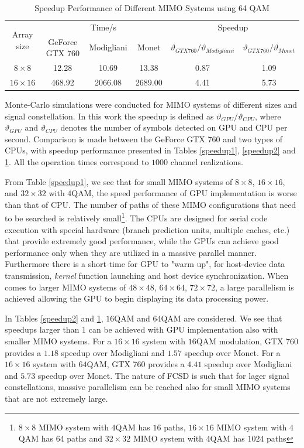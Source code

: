 \documentclass[letterpaper, 10pt, conference,twoside]{ieeeconf}
\begin{document}
\begin{table}[htb]
\centering
\caption{Speedup Performance of Different MIMO Systems using 64 QAM}
\begin{tabular}{|c|c|c|c|c|c|}
\hline
\multirow{2}{*}{ Array size} & \multicolumn{3}{|c|}{Time/s} & \multicolumn{2}{|c|}{Speedup}\\
\cline{2-6}
&GeForce GTX 760 & Modigliani & Monet &  $\vartheta_{GTX 760}/\vartheta_{Modigliani}$  &  $\vartheta_{GTX 760}/\vartheta_{Monet}$ \\
\hline
$8\times 8$&12.28& 10.69&13.38 & 0.87&1.09 \\
\hline
$16\times 16$&468.92 & 2066.08&2689.00& 4.41& 5.73\\
\hline
\end{tabular}
\label{speedup3}
\end{table}
Monte-Carlo simulations were conducted for MIMO systems of different sizes and signal constellation. In this work the speedup is defined as $\vartheta_{GPU}/\vartheta_{CPU}$, where $\vartheta_{GPU}$ and $\vartheta_{CPU}$ denotes the number of symbols detected on GPU and CPU per second. Comparison is made between the GeForce GTX 760 and two types of CPUs, with speedup performance presented in Tables \ref{speedup1}, \ref{speedup2} and \ref{speedup3}. All the operation times correspond to $1000$ channel realizations.

From Table \ref{speedup1}, we see that for small MIMO systems of $8\times 8$, $16\times 16$, and $32\times 32$ with $4$QAM, the speed performance of GPU implementation is worse than that of CPU. The number of paths of these MIMO configurations that need to be searched is relatively small\footnote{$8\times 8$ MIMO system with $4$QAM has $16$ paths, $16\times 16$ MIMO system with $4$QAM has $64$ paths and $32\times 32$ MIMO system with $4$QAM has $1024$ paths}. The CPUs are designed for serial code execution with special hardware (branch prediction units, multiple caches, etc.) that provide extremely good performance, while the GPUs can achieve good performance only when they are utilized in a massive parallel manner. Furthermore there is a short time for GPU to "warm up", for host-device data transmission, \textit{kernel} function  launching and host device synchronization. When comes to larger MIMO systems of $48\times 48$, $64\times 64$, $72\times 72$, a large parallelism is achieved allowing the GPU to begin displaying its data processing power. 

In Tables \ref{speedup2} and \ref{speedup3}, $16$QAM and $64$QAM are considered. We see that speedups larger than 1 can be achieved with GPU implementation also with smaller MIMO systems. For a $16\times 16$ system with $16$QAM modulation, GTX 760 provides a $1.18$ speedup over Modigliani and $1.57$ speedup over Monet. For a $16\times 16$ system with $64$QAM, GTX 760 provides a $4.41$ speedup over Modigliani and $5.73$ speedup over Monet. The nature of FCSD is such that for lager signal constellations, massive parallelism can be reached also for small MIMO systems that are not extremely large.
\end{document}
